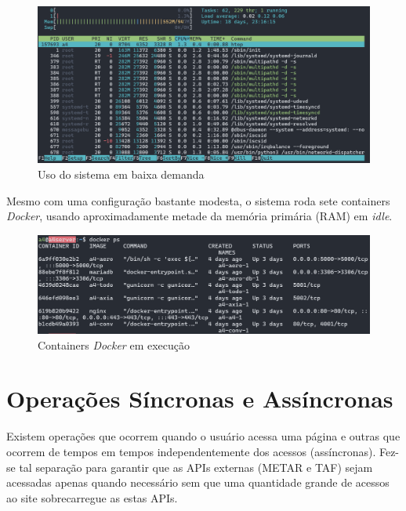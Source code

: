 \begin{figure}[ht]
    \begin{center}
    \includegraphics[width=400pt]{img/prod-idle.png}
    \caption{Uso do sistema em baixa demanda}
    \label{fig:prod-idle}
    \end{center}
\end{figure}

Mesmo com uma configuração bastante modesta, o sistema roda sete containers \textit{Docker}, usando 
aproximadamente metade da memória primária (RAM) em \textit{idle}.

\begin{figure}[ht]
    \begin{center}
    \includegraphics[width=400pt]{img/containers.png}
    \caption{Containers \textit{Docker} em execução}
    \label{fig:containers}
    \end{center}
\end{figure}

\section{Operações Síncronas e Assíncronas}

Existem operações que ocorrem quando o usuário acessa uma página e outras que
ocorrem de tempos em tempos independentemente dos acessos (assíncronas). Fez-se
tal separação para garantir que as APIs externas (METAR e TAF) sejam acessadas 
apenas quando
necessário sem que uma quantidade grande de acessos ao site sobrecarregue as estas APIs.

